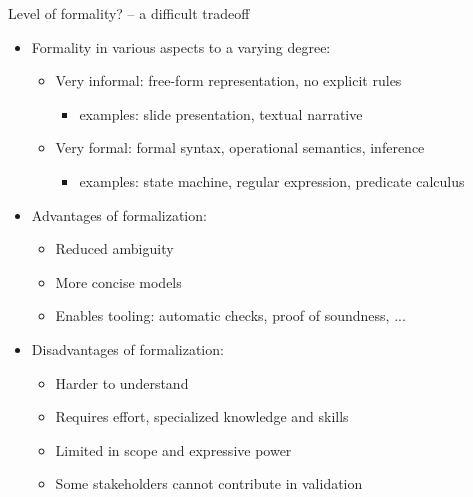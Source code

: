 \begin{Slide}{Level of formality? -- a difficult tradeoff}
\begin{itemize}
\item Formality in various aspects to a varying degree:
\begin{itemize}
\item Very informal: free-form representation, no explicit rules 
\begin{itemize}
\item examples: slide presentation, textual narrative
\end{itemize}
\item Very formal: formal syntax, operational semantics, inference
\begin{itemize}
\item examples: state machine, regular expression, predicate calculus
\end{itemize}
\end{itemize}
\item Advantages of formalization:
\begin{itemize}
\item Reduced ambiguity
\item More concise models
\item Enables tooling: automatic checks, proof of soundness, ...
\end{itemize}
\item Disadvantages of formalization:
\begin{itemize}
\item Harder to understand
\item Requires effort, specialized knowledge and skills
\item Limited in scope and expressive power
\item Some stakeholders cannot contribute in validation

\end{itemize}
\end{itemize}
\end{Slide}
